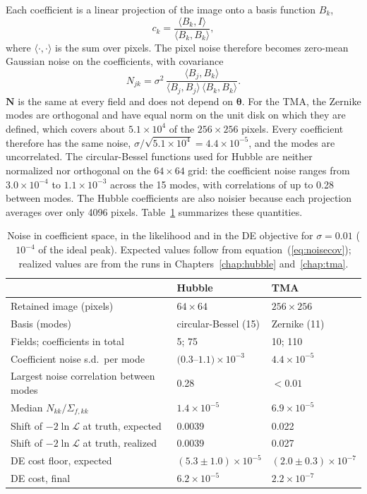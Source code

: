 Each coefficient is a linear projection of the image onto a basis function $B_k$,
\begin{equation}
c_k = \frac{\langle B_k, I\rangle}{\langle B_k, B_k\rangle},
\end{equation}
where $\langle\cdot,\cdot\rangle$ is the sum over pixels. The pixel noise therefore becomes zero-mean Gaussian noise on the coefficients, with covariance
\begin{equation}
N_{jk} = \sigma^2\,\frac{\langle B_j, B_k\rangle}{\langle B_j, B_j\rangle\,\langle B_k, B_k\rangle}.
\label{eq:noisecov}
\end{equation}
$\mathbf{N}$ is the same at every field and does not depend on $\boldsymbol{\theta}$. For the TMA, the Zernike modes are orthogonal and have equal norm on the unit disk on which they are defined, which covers about $5.1\times10^4$ of the $256\times256$ pixels. Every coefficient therefore has the same noise, $\sigma/\sqrt{5.1\times10^4}=4.4\times10^{-5}$, and the modes are uncorrelated. The circular-Bessel functions used for Hubble are neither normalized nor orthogonal on the $64\times64$ grid: the coefficient noise ranges from $3.0\times10^{-4}$ to $1.1\times10^{-3}$ across the 15 modes, with correlations of up to 0.28 between modes. The Hubble coefficients are also noisier because each projection averages over only 4096 pixels. Table~\ref{tab:noise_coeffs} summarizes these quantities.

\begin{table}
\centering
\caption[Noise in coefficient space, in the likelihood and in the DE objective.]{Noise in coefficient space, in the likelihood and in the DE objective for $\sigma=0.01$ ($10^{-4}$ of the ideal peak). Expected values follow from equation~(\ref{eq:noisecov}); realized values are from the runs in Chapters~\ref{chap:hubble} and~\ref{chap:tma}.}
\label{tab:noise_coeffs}
\begin{tabular}{lll}
\hline
 & \textbf{Hubble} & \textbf{TMA} \\
\hline
Retained image (pixels) & $64\times64$ & $256\times256$ \\
Basis (modes) & circular-Bessel (15) & Zernike (11) \\
Fields; coefficients in total & 5; 75 & 10; 110 \\
Coefficient noise s.d.\ per mode & $(0.3$--$1.1)\times10^{-3}$ & $4.4\times10^{-5}$ \\
Largest noise correlation between modes & 0.28 & $<0.01$ \\
Median $N_{kk}/\Sigma_{f,kk}$ & $1.4\times10^{-5}$ & $6.9\times10^{-5}$ \\
Shift of $-2\ln\mathcal{L}$ at truth, expected & 0.0039 & 0.022 \\
Shift of $-2\ln\mathcal{L}$ at truth, realized & 0.0039 & 0.027 \\
DE cost floor, expected & $(5.3\pm1.0)\times10^{-5}$ & $(2.0\pm0.3)\times10^{-7}$ \\
DE cost, final & $6.2\times10^{-5}$ & $2.2\times10^{-7}$ \\
\hline
\end{tabular}
\end{table}

